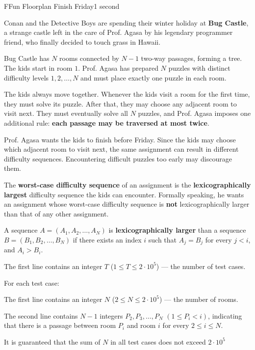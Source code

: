 \begin{problem}{F}{Fun Floorplan Finish Friday}{1 second}

\noindent
Conan and the Detective Boys are spending their winter holiday at \textbf{Bug Castle}, a strange castle left in the care of Prof. Agasa by his legendary programmer friend, who finally decided to touch grass in Hawaii.

\noindent
Bug Castle has $N$ rooms connected by $N-1$ two-way passages, forming a tree. The kids start in room $1$. Prof. Agasa has prepared $N$ puzzles with distinct difficulty levels $1,2,\ldots,N$ and must place exactly one puzzle in each room.

\noindent
The kids always move together. Whenever the kids visit a room for the first time, they must solve its puzzle. After that, they may choose any adjacent room to visit next. They must eventually solve all $N$ puzzles, and Prof. Agasa imposes one additional rule: \textbf{each passage may be traversed at most twice}.

\noindent
Prof. Agasa wants the kids to finish before Friday. Since the kids may choose which adjacent room to visit next, the same assignment can result in different difficulty sequences. Encountering difficult puzzles too early may discourage them. 

\noindent
The \textbf{worst-case difficulty sequence} of an assignment is the \textbf{lexicographically largest} difficulty sequence the kids can encounter. Formally speaking, he wants an assignment whose worst-case difficulty sequence is \textbf{not} lexicographically larger than that of any other assignment.

\noindent
A sequence $A=(A_1,A_2,\ldots,A_N)$ is \textbf{lexicographically larger} than a sequence $B=(B_1,B_2,\ldots,B_N)$ if there exists an index $i$ such that $A_j=B_j$ for every $j<i$, and $A_i>B_i$.

\InputFile

\noindent
The first line contains an integer $T$ ($1 \le T \le 2 \cdot 10^5$) --- the number of test cases.

\noindent
For each test case:

\noindent
The first line contains an integer $N$ ($2 \le N \le 2\cdot 10^5$) --- the number of rooms.

\noindent
The second line contains $N-1$ integers $P_2,P_3,\ldots,P_N$ $(1 \le P_i < i)$, indicating that there is a passage between room $P_i$ and room $i$ for every $2 \le i \le N$.

\noindent
It is guaranteed that the sum of $N$ in all test cases does not exceed $2\cdot 10^5$


\end{problem}
